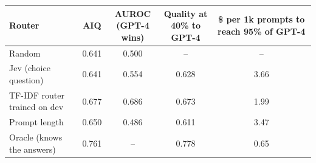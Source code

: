 \begin{tabular}{lcccc}
\toprule
Router & AIQ & \makecell{AUROC\\(GPT-4 wins)} & \makecell{Quality at\\40\% to GPT-4} & \makecell{\$ per 1k prompts to\\reach 95\% of GPT-4} \\
\midrule
Random & 0.641 & 0.500 & -- & -- \\
Jev (choice question) & 0.641 & 0.554 & 0.628 & 3.66 \\
TF-IDF router trained on dev & 0.677 & 0.686 & 0.673 & 1.99 \\
Prompt length & 0.650 & 0.486 & 0.611 & 3.47 \\
Oracle (knows the answers) & 0.761 & -- & 0.778 & 0.65 \\
\bottomrule
\end{tabular}
